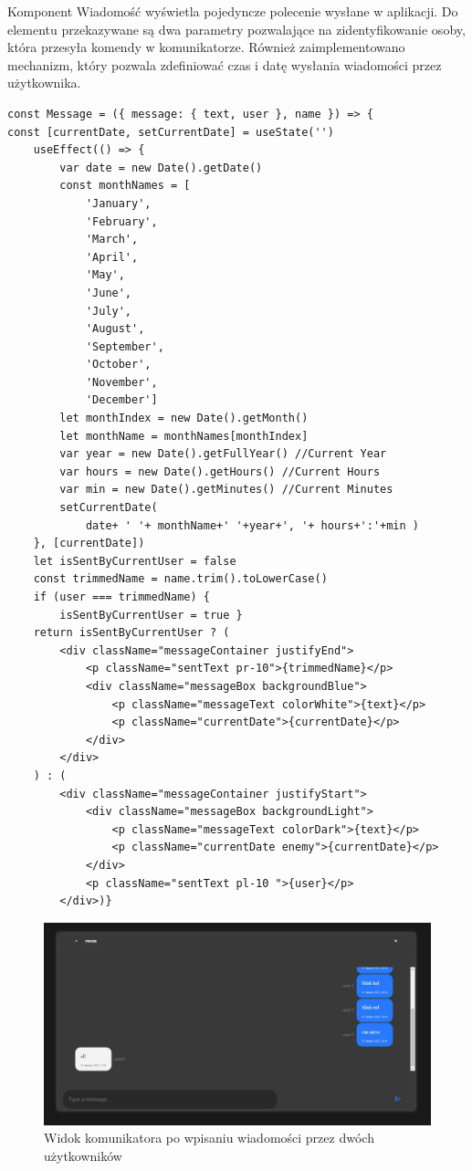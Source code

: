 Komponent Wiadomość wyświetla pojedyncze polecenie wysłane w aplikacji. Do elementu przekazywane są dwa parametry pozwalające na zidentyfikowanie osoby, która przesyła komendy w komunikatorze. Również zaimplementowano mechanizm, który pozwala zdefiniować czas i datę wysłania wiadomości przez użytkownika.
\newpage
\begin{lstlisting}[caption=Implementacja komponentu z pojedyncza wiadomoscia ]
const Message = ({ message: { text, user }, name }) => {
const [currentDate, setCurrentDate] = useState('')
    useEffect(() => {
        var date = new Date().getDate() 
        const monthNames = [
            'January',
            'February',
            'March',
            'April',
            'May',
            'June',
            'July',
            'August',
            'September',
            'October',
            'November',
            'December']
        let monthIndex = new Date().getMonth()
        let monthName = monthNames[monthIndex]
        var year = new Date().getFullYear() //Current Year
        var hours = new Date().getHours() //Current Hours
        var min = new Date().getMinutes() //Current Minutes
        setCurrentDate(
            date+ ' '+ monthName+' '+year+', '+ hours+':'+min )
    }, [currentDate])
    let isSentByCurrentUser = false
    const trimmedName = name.trim().toLowerCase()
    if (user === trimmedName) {
        isSentByCurrentUser = true }
    return isSentByCurrentUser ? (
        <div className="messageContainer justifyEnd">
            <p className="sentText pr-10">{trimmedName}</p>
            <div className="messageBox backgroundBlue">
                <p className="messageText colorWhite">{text}</p>
                <p className="currentDate">{currentDate}</p>
            </div>
        </div>
    ) : (
        <div className="messageContainer justifyStart">
            <div className="messageBox backgroundLight">
                <p className="messageText colorDark">{text}</p>
                <p className="currentDate enemy">{currentDate}</p>
            </div>
            <p className="sentText pl-10 ">{user}</p>
        </div>)}
\end{lstlisting}
\newpage
\begin{figure}[htbp]
	\centering
	\includegraphics[width=0.5\linewidth]{"obrazy/interface2.jpg"}
	\caption{Widok komunikatora po wpisaniu wiadomości przez dwóch użytkowników}
	\label{fig:13}
\end{figure}
